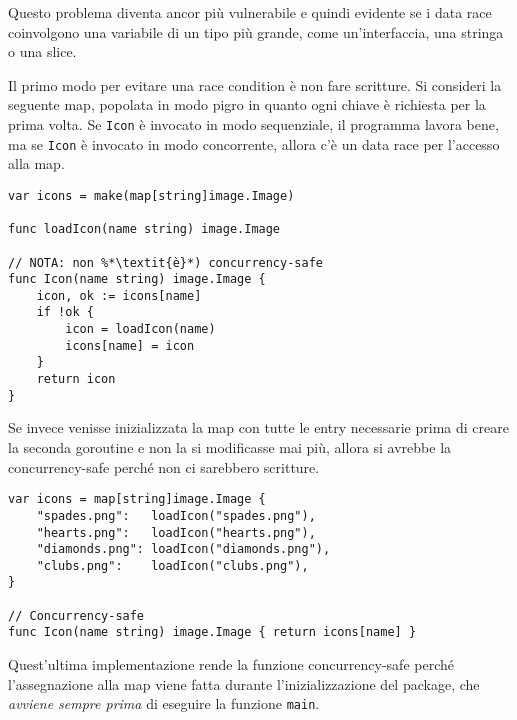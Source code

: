 \documentclass[../../thesis.tex]{subfiles}
\begin{document}
    Questo problema diventa ancor più vulnerabile e quindi evidente se i data race coinvolgono una variabile di un tipo più grande, come un'interfaccia, una stringa o una slice.
    \hfill \vspace{12pt}

    Il primo modo per evitare una race condition è non fare scritture.
    Si consideri la seguente map, popolata in modo pigro in quanto ogni chiave è richiesta per la prima volta.
    Se \verb"Icon" è invocato in modo sequenziale, il programma lavora bene, ma se \verb"Icon" è invocato in modo concorrente, allora c'è un data race per l'accesso alla map.
    \begin{lstlisting}[frame = single,label={lst:lstlisting9-1.4}]
var icons = make(map[string]image.Image)

func loadIcon(name string) image.Image

// NOTA: non %*\textit{è}*) concurrency-safe
func Icon(name string) image.Image {
    icon, ok := icons[name]
    if !ok {
        icon = loadIcon(name)
        icons[name] = icon
    }
    return icon
}
    \end{lstlisting}
    \newpage
    \noindent Se invece venisse inizializzata la map con tutte le entry necessarie prima di creare la seconda goroutine e non la si modificasse mai più, allora si avrebbe la concurrency-safe perché non ci sarebbero scritture.
    \begin{lstlisting}[frame = single,label={lst:lstlisting9-1.5}]
var icons = map[string]image.Image {
    "spades.png":   loadIcon("spades.png"),
    "hearts.png":   loadIcon("hearts.png"),
    "diamonds.png": loadIcon("diamonds.png"),
    "clubs.png":    loadIcon("clubs.png"),
}

// Concurrency-safe
func Icon(name string) image.Image { return icons[name] }
    \end{lstlisting}
    Quest'ultima implementazione rende la funzione concurrency-safe perché l'assegnazione alla map viene fatta durante l'inizializzazione del package, che \textit{avviene sempre prima} di eseguire la funzione \verb"main".
    \hfill \vspace{12pt}
\end{document}
